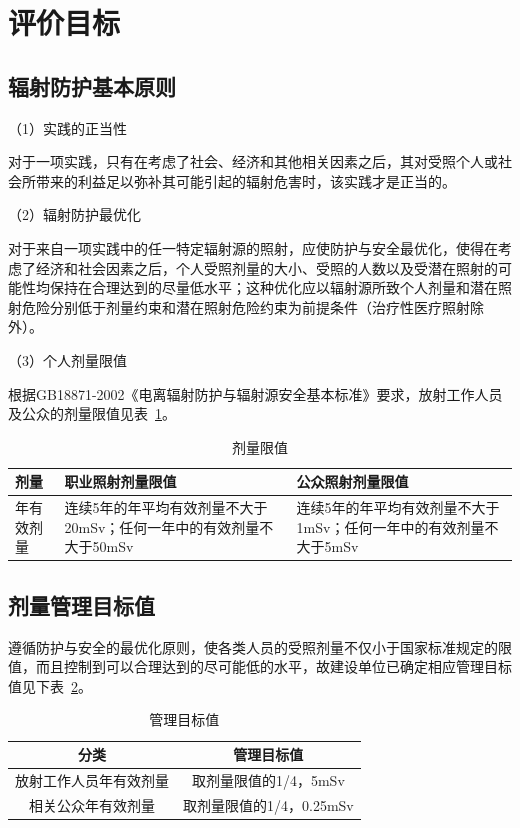 \section{评价目标}

\subsection{辐射防护基本原则}

（1）实践的正当性

对于一项实践，只有在考虑了社会、经济和其他相关因素之后，其对受照个人或社会所带来的利益足以弥补其可能引起的辐射危害时，该实践才是正当的。

（2）辐射防护最优化

对于来自一项实践中的任一特定辐射源的照射，应使防护与安全最优化，使得在考虑了经济和社会因素之后，个人受照剂量的大小、受照的人数以及受潜在照射的可能性均保持在合理达到的尽量低水平；这种优化应以辐射源所致个人剂量和潜在照射危险分别低于剂量约束和潜在照射危险约束为前提条件（治疗性医疗照射除外）。

（3）个人剂量限值

根据GB18871-2002《电离辐射防护与辐射源安全基本标准》要求，放射工作人员及公众的剂量限值见表~\ref{tab:ch1-6-t1-0d487f75}。



\begin{table}[H]
\centering
\caption{剂量限值}
\label{tab:ch1-6-t1-0d487f75}
\begin{tabular}{|>{\centering\arraybackslash}m{3cm}|>{\centering\arraybackslash}m{6cm}|>{\centering\arraybackslash}m{6cm}|}
\hline
剂量 & 职业照射剂量限值 & 公众照射剂量限值 \\
\hline
年有效剂量 & 连续5年的年平均有效剂量不大于20mSv；任何一年中的有效剂量不大于50mSv & 连续5年的年平均有效剂量不大于1mSv；任何一年中的有效剂量不大于5mSv \\
\hline
\end{tabular}
\end{table}


\subsection{剂量管理目标值}

遵循防护与安全的最优化原则，使各类人员的受照剂量不仅小于国家标准规定的限值，而且控制到可以合理达到的尽可能低的水平，故建设单位已确定相应管理目标值见下表~\ref{tab:ch1-6-t2-5e9dafeb}。


\begin{table}[H]
\centering
\caption{管理目标值}
\label{tab:ch1-6-t2-5e9dafeb}
\begin{tabular}{|c|c|}
\hline
分类 & 管理目标值 \\
\hline
放射工作人员年有效剂量 & 取剂量限值的1/4，5mSv \\
\hline
相关公众年有效剂量 & 取剂量限值的1/4，0.25mSv \\
\hline
\end{tabular}
\end{table}


